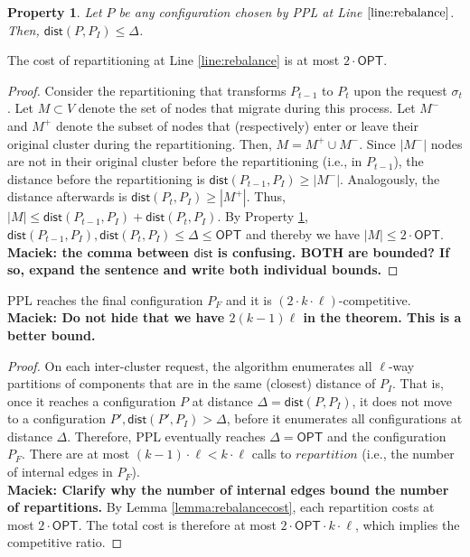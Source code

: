 \documentclass[manuscript,screen=true, review, anonymous]{acmart}
\newcommand{\OPT}{\textsf{OPT}\xspace}
\newcommand{\PPL}{\textsf{PPL}\xspace}
\newcommand{\dist}{\textsf{dist}}
\newtheorem{property}{Property}
\newcommand\mahmoud[1]{\color{green}\textbf{\\ Mahmoud: #1}\\\color{black}}
\newcommand\maciek[1]{\color{brown}\textbf{\\ Maciek: #1}\color{black}}
\begin{document}
\begin{property} \label{prop:dist<OPT}
    Let $P$ be any configuration chosen by \PPL at Line $\ref{line:rebalance}$.
    Then, $\dist(P,P_I) \leq \Delta$.
\end{property}

\begin{lemma}	\label{lemma:rebalancecost}
    The cost of repartitioning at Line \ref{line:rebalance} is at most $2\cdot\OPT$.
\end{lemma}
\begin{proof}
    Consider the repartitioning that transforms $P_{t-1}$ to $P_t$ upon the request $\sigma_t$.
    Let $M \subset V$ denote the set of nodes that migrate during this process.
	Let $M^-$ and $M^+$ denote the subset of nodes that (respectively)
    enter or leave their original cluster during the repartitioning.    
    Then,
    $M = M^+ \cup M^-$.
    Since $|M^-|$ nodes are not in their original cluster before the repartitioning (i.e., in $P_{t-1}$),
    the distance before the repartitioning is $\dist(P_{t-1},P_I) \geq | M^-|$.
    Analogously,
     the distance afterwards is $\dist(P_{t},P_I) \geq | M^+|$.
    Thus,
    $|M| \leq \dist(P_{t-1},P_I) + \dist(P_{t},P_I)$.
    By Property \ref{prop:dist<OPT},
    $\dist(P_{t-1},P_I) , \dist(P_{t},P_I) \leq \Delta \leq \OPT$
    and thereby we have	
    $|M| \leq 2\cdot\OPT$.
    \maciek{the comma between $\dist$ is confusing. BOTH are bounded? If so, expand the sentence and write both individual bounds.}
\end{proof}

\begin{theorem}	\label{thm:upperbound}
    \PPL reaches the final configuration $P_F$ and it is $(2\cdot k\cdot\ell)$-competitive.
    \maciek{Do not hide that we have $2(k-1)\ell$ in the theorem. This is a better bound.}
\end{theorem}
\begin{proof}
      On each inter-cluster request,
     the algorithm enumerates all $\ell$-way partitions of components
     that are in the same (closest) distance of $P_I$.
     That is, 
     once it reaches a configuration $P$ at distance $\Delta = \dist(P, P_I)$,
     it does not move to a configuration
     $P', \dist(P', P_I) > \Delta$,
     before it enumerates all configurations at distance $\Delta$.
     Therefore,
     \PPL eventually reaches $\Delta=\OPT$ and the configuration $P_F$.
    There are at most $(k-1)\cdot\ell < k\cdot\ell $ calls   to $\mathit{repartition}$
     (i.e., the number of internal edges in $P_F$).
     \maciek{Clarify why the number of internal edges bound the number of repartitions.}
    By Lemma \ref{lemma:rebalancecost},
    each repartition costs at most $2\cdot\OPT$.
    The total cost is therefore at most $2\cdot\OPT\cdot k\cdot\ell$, which implies the competitive ratio.
 \end{proof}
\end{document}

